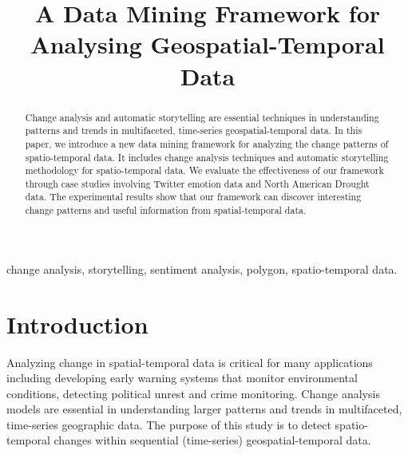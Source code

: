 \documentclass[conference]{IEEEtran}
\begin{document}
\title{A Data Mining Framework for Analysing Geospatial-Temporal Data}
\author{
\and
{}
}
\maketitle

\begin{abstract}
Change analysis and automatic storytelling are essential techniques in understanding patterns and trends in multifaceted, time-series geospatial-temporal data. In this paper, we introduce  a new data mining framework for analyzing the change patterns of spatio-temporal data. It includes  change analysis techniques and automatic storytelling methodology  for  spatio-temporal  data. We evaluate the effectiveness  of our framework  through case studies involving  Twitter emotion data and North American Drought data. The experimental results show that our framework can discover interesting change patterns  and useful information  from spatial-temporal data.
\end{abstract}

\begin{IEEEkeywords}
change analysis, storytelling, sentiment analysis, polygon, spatio-temporal data.
\end{IEEEkeywords}


\section{Introduction}
Analyzing change in spatial-temporal data is critical for many applications including developing early warning systems that monitor environmental conditions, detecting political unrest and crime monitoring.  Change analysis models are essential in understanding larger patterns and trends in multifaceted, time-series geographic data.  The purpose of this study is to detect spatio-temporal changes within sequential (time-series) geospatial-temporal data.
\end{document}
